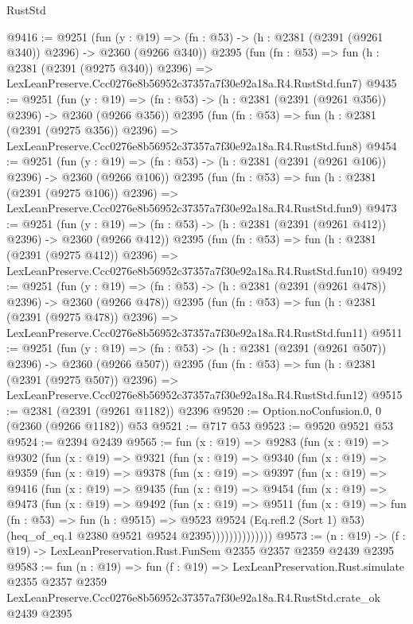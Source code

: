 \begin{lexlean}{RustStd}
\begin{coremodule}
@9416 := @9251
    (fun (y : @19) => (fn : @53) -> (h : @2381 (@2391 (@9261 @340)) @2396) -> @2360 (@9266 @340))
    @2395
    (fun (fn : @53) =>
    fun (h : @2381 (@2391 (@9275 @340)) @2396) =>
    LexLeanPreserve.Ccc0276e8b56952c37357a7f30e92a18a.R4.RustStd.fun7)
@9435 := @9251
    (fun (y : @19) => (fn : @53) -> (h : @2381 (@2391 (@9261 @356)) @2396) -> @2360 (@9266 @356))
    @2395
    (fun (fn : @53) =>
    fun (h : @2381 (@2391 (@9275 @356)) @2396) =>
    LexLeanPreserve.Ccc0276e8b56952c37357a7f30e92a18a.R4.RustStd.fun8)
@9454 := @9251
    (fun (y : @19) => (fn : @53) -> (h : @2381 (@2391 (@9261 @106)) @2396) -> @2360 (@9266 @106))
    @2395
    (fun (fn : @53) =>
    fun (h : @2381 (@2391 (@9275 @106)) @2396) =>
    LexLeanPreserve.Ccc0276e8b56952c37357a7f30e92a18a.R4.RustStd.fun9)
@9473 := @9251
    (fun (y : @19) => (fn : @53) -> (h : @2381 (@2391 (@9261 @412)) @2396) -> @2360 (@9266 @412))
    @2395
    (fun (fn : @53) =>
    fun (h : @2381 (@2391 (@9275 @412)) @2396) =>
    LexLeanPreserve.Ccc0276e8b56952c37357a7f30e92a18a.R4.RustStd.fun10)
@9492 := @9251
    (fun (y : @19) => (fn : @53) -> (h : @2381 (@2391 (@9261 @478)) @2396) -> @2360 (@9266 @478))
    @2395
    (fun (fn : @53) =>
    fun (h : @2381 (@2391 (@9275 @478)) @2396) =>
    LexLeanPreserve.Ccc0276e8b56952c37357a7f30e92a18a.R4.RustStd.fun11)
@9511 := @9251
    (fun (y : @19) => (fn : @53) -> (h : @2381 (@2391 (@9261 @507)) @2396) -> @2360 (@9266 @507))
    @2395
    (fun (fn : @53) =>
    fun (h : @2381 (@2391 (@9275 @507)) @2396) =>
    LexLeanPreserve.Ccc0276e8b56952c37357a7f30e92a18a.R4.RustStd.fun12)
@9515 := @2381 (@2391 (@9261 @1182)) @2396
@9520 := Option.noConfusion.{0, 0} (@2360 (@9266 @1182)) @53
@9521 := @717 @53
@9523 := @9520 @9521 @53
@9524 := @2394 @2439
@9565 := fun (x : @19) =>
  @9283
    (fun (x : @19) =>
    @9302
      (fun (x : @19) =>
      @9321
        (fun (x : @19) =>
        @9340
          (fun (x : @19) =>
          @9359
            (fun (x : @19) =>
            @9378
              (fun (x : @19) =>
              @9397
                (fun (x : @19) =>
                @9416
                  (fun (x : @19) =>
                  @9435
                    (fun (x : @19) =>
                    @9454
                      (fun (x : @19) =>
                      @9473
                        (fun (x : @19) =>
                        @9492
                          (fun (x : @19) =>
                          @9511
                            (fun (x : @19) =>
                            fun (fn : @53) =>
                            fun (h : @9515) =>
                            @9523
                              @9524
                              (Eq.refl.{2} (Sort 1) @53)
                              (heq_of_eq.{1} @2380 @9521 @9524 @2395))))))))))))))
@9573 := (n : @19) -> (f : @19) -> LexLeanPreservation.Rust.FunSem @2355 @2357 @2359 @2439 @2395
@9583 := fun (n : @19) =>
  fun (f : @19) =>
  LexLeanPreservation.Rust.simulate
    @2355
    @2357
    @2359
    LexLeanPreserve.Ccc0276e8b56952c37357a7f30e92a18a.R4.RustStd.crate_ok
    @2439
    @2395
\end{coremodule}
\end{lexlean}
